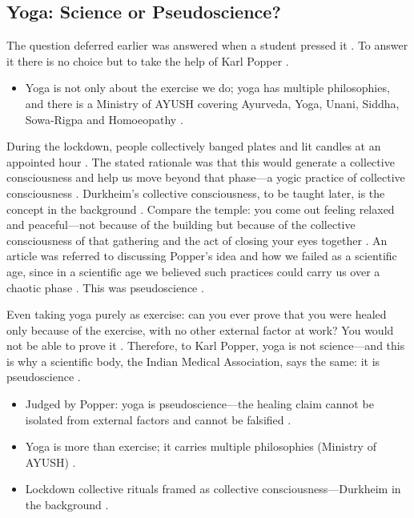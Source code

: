 \subsection{Yoga: Science or Pseudoscience?}
The question deferred earlier was answered when a student pressed it . To answer it there is no choice but to take the help of Karl Popper .
\begin{itemize}
    \item Yoga is not only about the exercise we do; yoga has multiple philosophies, and there is a Ministry of AYUSH covering Ayurveda, Yoga, Unani, Siddha, Sowa-Rigpa and Homoeopathy .
\end{itemize}

\begin{ExampleBox}
During the lockdown, people collectively banged plates and lit candles at an appointed hour . The stated rationale was that this would generate a collective consciousness and help us move beyond that phase---a yogic practice of collective consciousness . Durkheim's collective consciousness, to be taught later, is the concept in the background . Compare the temple: you come out feeling relaxed and peaceful---not because of the building but because of the collective consciousness of that gathering and the act of closing your eyes together . An article was referred to discussing Popper's idea and how we failed as a scientific age, since in a scientific age we believed such practices could carry us over a chaotic phase . This was pseudoscience .
\end{ExampleBox}

\begin{CriticalPoint}
Even taking yoga purely as exercise: can you ever prove that you were healed only because of the exercise, with no other external factor at work? You would not be able to prove it . Therefore, to Karl Popper, yoga is not science---and this is why a scientific body, the Indian Medical Association, says the same: it is pseudoscience .
\end{CriticalPoint}

\begin{QuickRevision}
\begin{itemize}
    \item Judged by Popper: yoga is pseudoscience---the healing claim cannot be isolated from external factors and cannot be falsified .
    \item Yoga is more than exercise; it carries multiple philosophies (Ministry of AYUSH) .
    \item Lockdown collective rituals framed as collective consciousness---Durkheim in the background .
\end{itemize}
\end{QuickRevision}

